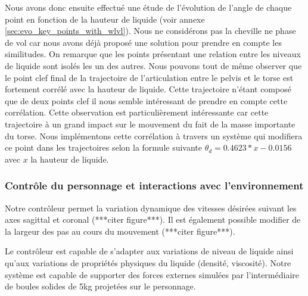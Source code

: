 \documentclass[runningheads,a4paper]{llncs}
\begin{document}
Nous avons donc ensuite effectué une étude de l'évolution de l'angle de chaque point en fonction de la hauteur de liquide (voir annexe \ref{sec:evo_key_points_with_wlvl}). Nous ne considérons pas la cheville ne phase de vol car nous avons déjà proposé une solution pour prendre en compte les similitudes. On remarque que les points présentant une relation entre les niveaux de liquide sont isolés les un des autres. Nous pouvons tout de même observer que le point clef final de la trajectoire de l'articulation entre le pelvis et le torse est fortement corrélé avec la hauteur de liquide. Cette trajectoire n'étant composé que de deux points clef il nous semble intéressant de prendre en compte cette corrélation. Cette observation est particulièrement intéressante car cette trajectoire à un grand impact sur le mouvement du fait de la masse importante du torse. Nous implémentons cette corrélation à travers un système qui modifiera ce point dans les trajectoires selon la formule suivante $\theta_d=0.4623*x-0.0156$ avec $x$ la hauteur de liquide.

\subsubsection{Contrôle du personnage et interactions avec l'environnement}

Notre contrôleur permet la variation dynamique des vitesses désirées suivant les axes sagittal et coronal (***citer figure***). Il est également possible modifier de la largeur des pas au cours du mouvement (***citer figure***).

Le contrôleur est capable de s'adapter aux variations de niveau de liquide ainsi qu'aux variations de propriétés physiques du liquide (densité, viscosité). Notre système est capable de supporter des forces externes simulées par l'intermédiaire de boules solides de 5kg projetées sur le personnage. 
\end{document}
